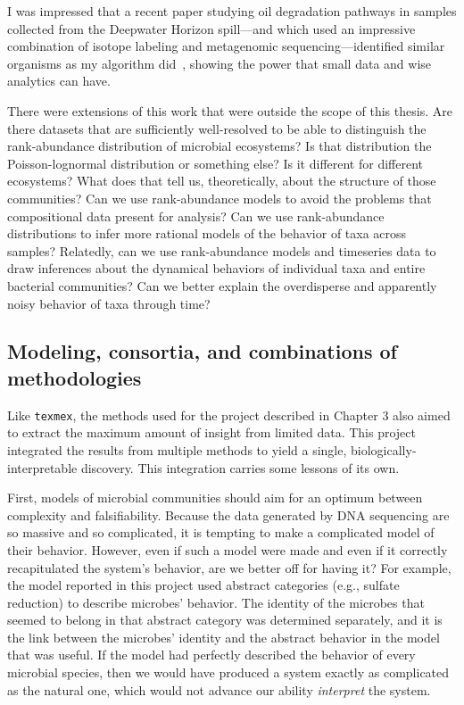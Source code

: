 I was impressed that a recent paper studying oil degradation pathways in
samples collected from the Deepwater Horizon spill---and which used an impressive
combination of isotope labeling and metagenomic sequencing---identified similar organisms
as my algorithm did~\cite{dombrowski_reconstructing_2016}, showing the power
that small data and wise analytics can have.

There were extensions of this work that were outside the scope of this
thesis. Are there datasets that are sufficiently well-resolved to be able
to distinguish the rank-abundance distribution of microbial ecosystems?
Is that distribution the Poisson-lognormal distribution or something else? Is it different
for different ecosystems? What does that tell us, theoretically,
about the structure of those communities? Can we use rank-abundance models
to avoid the problems that compositional data present for analysis?
Can we use rank-abundance distributions to infer more rational models of
the behavior of taxa across samples? Relatedly, can we use rank-abundance
models and timeseries data to draw inferences about the dynamical behaviors
of individual taxa and entire bacterial communities? Can we better explain
the overdisperse and apparently noisy behavior of taxa through time?

\subsection{Modeling, consortia, and combinations of methodologies}
Like \texttt{texmex},
the methods used for the project described in Chapter 3 also aimed to extract the maximum amount of
insight from limited data. This project integrated the results from
multiple methods to yield a single, biologically-interpretable discovery.
This integration carries some lessons of its own.

First, models of microbial communities should aim for an optimum between complexity
and falsifiability. Because the data generated by DNA sequencing are so
massive and so complicated, it is tempting to make a complicated model
of their behavior. However, even if such a model were made and even if it
correctly recapitulated the system's behavior, are we better off for
having it? For example, the model reported in this project used abstract
categories (e.g., sulfate reduction) to describe microbes' behavior.
The identity of the microbes that seemed to belong in that abstract
category was determined separately, and it is the link between the
microbes' identity and the abstract behavior in the model that was useful.
If the model had perfectly described the behavior of every microbial
species, then we would have produced a system exactly as complicated
as the natural one, which would not advance our ability \emph{interpret}
the system.

